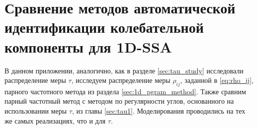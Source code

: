 \documentclass[specialist,
               substylefile = spbu.rtx,
               subf,href,colorlinks=true, 12pt]{disser}
\begin{document}




\appendix
\chapter{Сравнение методов автоматической идентификации колебательной компоненты для 1D-SSA}
\label{sec:compare}
В данном приложении, аналогично, как в разделе \ref{sec:tau_study} исследовали распределение меры $\tau$, исследуем распределение меры $\rho_{ij}$, заданной в \eqref{eq:rho_ij}, парного частотного метода из раздела \ref{sec:1d_pgram_method}. Также сравним парный частотный метод с методом по регулярности углов, основанного на использовании меры $\tau$, из главы \ref{sec:tau1}.
Моделирования проводились на тех же самых реализациях, что и для $\tau$.
%
\end{document}
